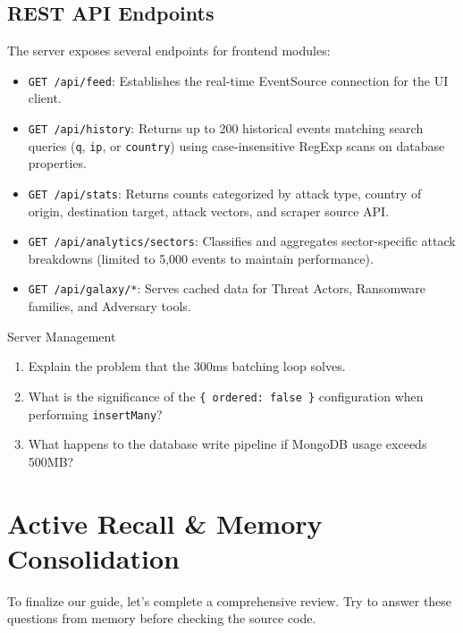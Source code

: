 \documentclass[11pt,a4paper]{report}
\begin{document}
\section{REST API Endpoints}
The server exposes several endpoints for frontend modules:
\begin{itemize}
  \item \texttt{GET /api/feed}: Establishes the real-time EventSource connection for the UI client.
  \item \texttt{GET /api/history}: Returns up to 200 historical events matching search queries (\texttt{q}, \texttt{ip}, or \texttt{country}) using case-insensitive RegExp scans on database properties.
  \item \texttt{GET /api/stats}: Returns counts categorized by attack type, country of origin, destination target, attack vectors, and scraper source API.
  \item \texttt{GET /api/analytics/sectors}: Classifies and aggregates sector-specific attack breakdowns (limited to 5,000 events to maintain performance).
  \item \texttt{GET /api/galaxy/*}: Serves cached data for Threat Actors, Ransomware families, and Adversary tools.
\end{itemize}

\begin{activerecall}{Server Management}
  \begin{enumerate}
    \item Explain the problem that the 300ms batching loop solves.
    \item What is the significance of the \texttt{\{ ordered: false \}} configuration when performing \texttt{insertMany}?
    \item What happens to the database write pipeline if MongoDB usage exceeds 500MB?
  \end{enumerate}
\end{activerecall}

\newpage

\chapter{Active Recall \& Memory Consolidation}

To finalize our guide, let's complete a comprehensive review. Try to answer these questions from memory before checking the source code.
\end{document}
